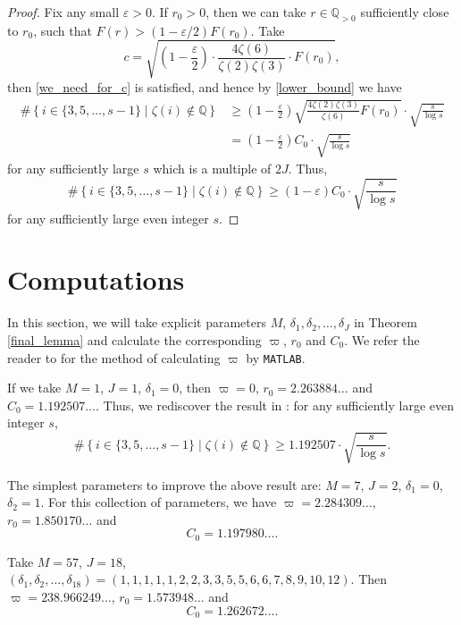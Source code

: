 \documentclass[12pt]{article}
\numberwithin{equation}{section}
\begin{document}
\begin{proof}
Fix any small $\varepsilon > 0$. If $r_0 > 0$, then we can take $r \in \mathbb{Q}_{>0}$ sufficiently close to $r_0$, such that $F(r) > (1-\varepsilon/2) F(r_0)$. Take 
\[ c = \sqrt{ \left( 1-\frac{\varepsilon}{2} \right) \cdot \frac{4\zeta(6)}{\zeta(2)\zeta(3)} \cdot F(r_0) }, \]
then \eqref{we_need_for_c} is satisfied, and hence by \eqref{lower_bound} we have 
\begin{align*}
\# \left\{  i \in \{3,5,\ldots,s-1\}  \mid  \zeta(i) \not\in \mathbb{Q} \right\}  &\geqslant \left( 1-\frac{\varepsilon}{2} \right) \sqrt{ \frac{4\zeta(2)\zeta(3)}{\zeta(6)} F(r_0) } \cdot \sqrt{\frac{s}{\log s}}  \\
&= \left( 1-\frac{\varepsilon}{2} \right) C_0 \cdot \sqrt{\frac{s}{\log s}}
\end{align*}
for any sufficiently large $s$ which is a multiple of $2J$. Thus,
\[ \# \left\{  i \in \{3,5,\ldots,s-1\}  \mid  \zeta(i) \not\in \mathbb{Q} \right\}  \geqslant (1-\varepsilon)C_0 \cdot \sqrt{\frac{s}{\log s}} \]
for any sufficiently large even integer $s$.






\end{proof}




\section{Computations}\label{sec_6}

In this section, we will take explicit parameters $M$, $\delta_1,\delta_2,\ldots,\delta_J$ in Theorem \ref{final_lemma} and calculate the corresponding $\varpi$, $r_0$ and $C_0$. We refer the reader to \cite[\S 5]{LZ2022} for the method of calculating $\varpi$ by \texttt{MATLAB}.

If we take $M=1$, $J=1$, $\delta_1 = 0$, then $\varpi = 0$, $r_0 = 2.263884\ldots$ and $C_0 = 1.192507\ldots$. Thus, we rediscover the result in \cite{LY2020}: for any sufficiently large even integer $s$, 
\[ \# \left\{  i \in \{3,5,\ldots,s-1\}  \mid  \zeta(i) \not\in \mathbb{Q} \right\}  \geqslant 1.192507 \cdot \sqrt{\frac{s}{\log s}}. \]


The simplest parameters to improve the above result are: $M=7$, $J=2$, $\delta_1=0$, $\delta_2 = 1$. For this collection of parameters, we have $\varpi = 2.284309\ldots$, $r_0 = 1.850170\ldots$ and 
\[ C_0 = 1.197980\ldots. \]

Take $M=57$, $J=18$, $(\delta_1,\delta_2,\ldots,\delta_{18}) = (1,1,1,1,1,2,2,3,3,5,5,6,6,7,8,9,10,12)$. Then $\varpi = 238.966249\ldots$, $r_0 = 1.573948\ldots$ and
\[ C_0 = 1.262672\ldots.  \]
\end{document}
